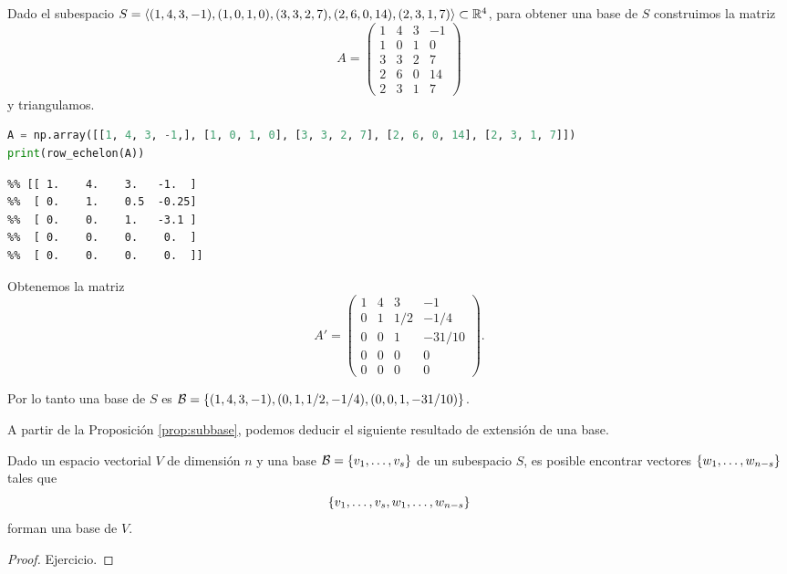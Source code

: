 \begin{ejemplo}
Dado el subespacio $S = \langle( 1,  4,  3, -1), (1,  0,  1,  0), (3,  3,  2,  7), (2,  6,  0, 14),( 2,  3,  1,  7)\rangle \subset \mathbb R^4$, para obtener una base de $S$ construimos la matriz
$$
A =
\begin{pmatrix}
 1 & 4 & 3 & -1 \\
 1 & 0 & 1 &  0 \\
 3 & 3 & 2 &  7 \\
 2 & 6 & 0 & 14 \\
 2 & 3 & 1 &  7
\end{pmatrix}
$$
y triangulamos.

\begin{Shaded}
\begin{lstlisting}[language=Python]
A = np.array([[1, 4, 3, -1,], [1, 0, 1, 0], [3, 3, 2, 7], [2, 6, 0, 14], [2, 3, 1, 7]])
print(row_echelon(A))
\end{lstlisting}
\end{Shaded}

\begin{verbatim}
%% [[ 1.    4.    3.   -1.  ]
%%  [ 0.    1.    0.5  -0.25]
%%  [ 0.    0.    1.   -3.1 ]
%%  [ 0.    0.    0.    0.  ]
%%  [ 0.    0.    0.    0.  ]]
\end{verbatim}

Obtenemos la matriz
$$
A' =
\begin{pmatrix}
 1 & 4 & 3 & -1 \\
 0 & 1 & 1/2 &  -1/4 \\
 0 & 0 & 1 &  -31/10 \\
 0 & 0 & 0 & 0 \\
 0 & 0 & 0 & 0
\end{pmatrix}.
$$

Por lo tanto una base de $S$ es $\mathcal B = \{(1, 4, 3, -1), (0, 1, 1/2, -1/4), (0, 0, 1, -31/10)\}$.
\end{ejemplo}

A partir de la Proposici\'on \ref{prop:subbase}, podemos deducir el siguiente resultado de extensión de una base.

\begin{proposicion}
\label{prop:extension}
Dado un espacio vectorial $V$ de dimensión $n$ y una base $\B = \{\vb_1, \dots, \vb_s\}$ de un subespacio $S$, es posible encontrar vectores $\{\wb_1, \dots, \wb_{n-s}\}$ tales que
$$
\{\vb_1, \dots, \vb_s, \wb_1, \dots, \wb_{n-s}\}
$$
forman una base de $V$.
\end{proposicion}
\begin{proof} Ejercicio.
\end{proof}

